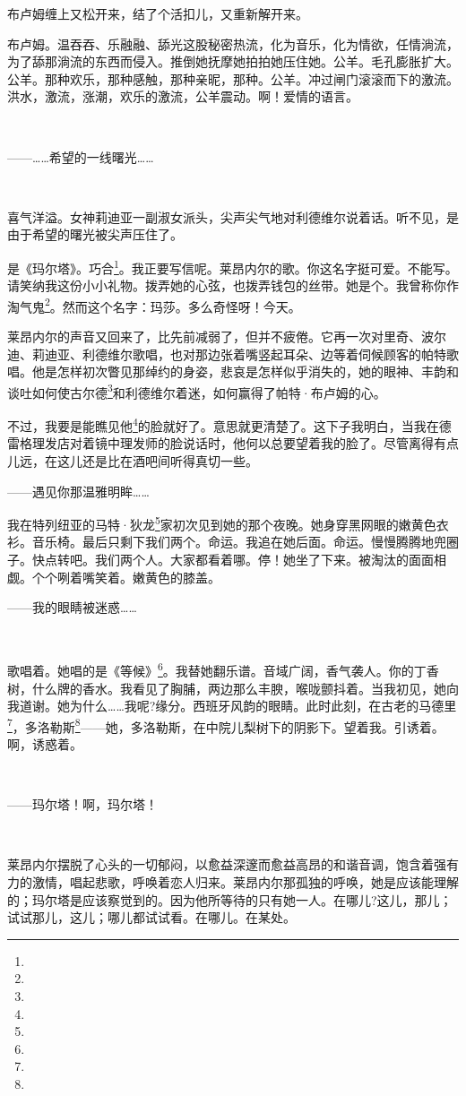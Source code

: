 \par 布卢姆缠上又松开来，结了个活扣儿，又重新解开来。
\par 布卢姆。温吞吞、乐融融、舔光这股秘密热流，化为音乐，化为情欲，任情淌流，为了舔那淌流的东西而侵入。推倒她抚摩她拍拍她压住她。公羊。毛孔膨胀扩大。公羊。那种欢乐，那种感触，那种亲昵，那种。公羊。冲过闸门滚滚而下的激流。洪水，激流，涨潮，欢乐的激流，公羊震动。啊！爱情的语言。
\par  
\par ——……希望的一线曙光……
\par  
\par 喜气洋溢。女神莉迪亚一副淑女派头，尖声尖气地对利德维尔说着话。听不见，是由于希望的曙光被尖声压住了。
\par 是《玛尔塔》。巧合\footnote{}。我正要写信呢。莱昂内尔的歌。你这名字挺可爱。不能写。请笑纳我这份小小礼物。拨弄她的心弦，也拨弄钱包的丝带。她是个。我曾称你作淘气鬼\footnote{}。然而这个名字：玛莎。多么奇怪呀！今天。
\par 莱昂内尔的声音又回来了，比先前减弱了，但并不疲倦。它再一次对里奇、波尔迪、莉迪亚、利德维尔歌唱，也对那边张着嘴竖起耳朵、边等着伺候顾客的帕特歌唱。他是怎样初次瞥见那绰约的身姿，悲哀是怎样似乎消失的，她的眼神、丰韵和谈吐如何使古尔德\footnote{}和利德维尔着迷，如何赢得了帕特·布卢姆的心。
\par 不过，我要是能瞧见他\footnote{}的脸就好了。意思就更清楚了。这下子我明白，当我在德雷格理发店对着镜中理发师的脸说话时，他何以总要望着我的脸了。尽管离得有点儿远，在这儿还是比在酒吧间听得真切一些。
\par ——遇见你那温雅明眸……
\par 我在特列纽亚的马特·狄龙\footnote{}家初次见到她的那个夜晚。她身穿黑网眼的嫩黄色衣衫。音乐椅。最后只剩下我们两个。命运。我追在她后面。命运。慢慢腾腾地兜圈子。快点转吧。我们两个人。大家都看着哪。停！她坐了下来。被淘汰的面面相觑。个个咧着嘴笑着。嫩黄色的膝盖。
\par ——我的眼睛被迷惑……
\par  
\par 歌唱着。她唱的是《等候》\footnote{}。我替她翻乐谱。音域广阔，香气袭人。你的丁香树，什么牌的香水。我看见了胸脯，两边那么丰腴，喉咙颤抖着。当我初见，她向我道谢。她为什么……我呢?缘分。西班牙风韵的眼睛。此时此刻，在古老的马德里\footnote{}，多洛勒斯\footnote{}——她，多洛勒斯，在中院儿梨树下的阴影下。望着我。引诱着。啊，诱惑着。
\par  
\par ——玛尔塔！啊，玛尔塔！
\par  
\par 莱昂内尔摆脱了心头的一切郁闷，以愈益深邃而愈益高昂的和谐音调，饱含着强有力的激情，唱起悲歌，呼唤着恋人归来。莱昂内尔那孤独的呼唤，她是应该能理解的；玛尔塔是应该察觉到的。因为他所等待的只有她一人。在哪儿?这儿，那儿；试试那儿，这儿；哪儿都试试看。在哪儿。在某处。
